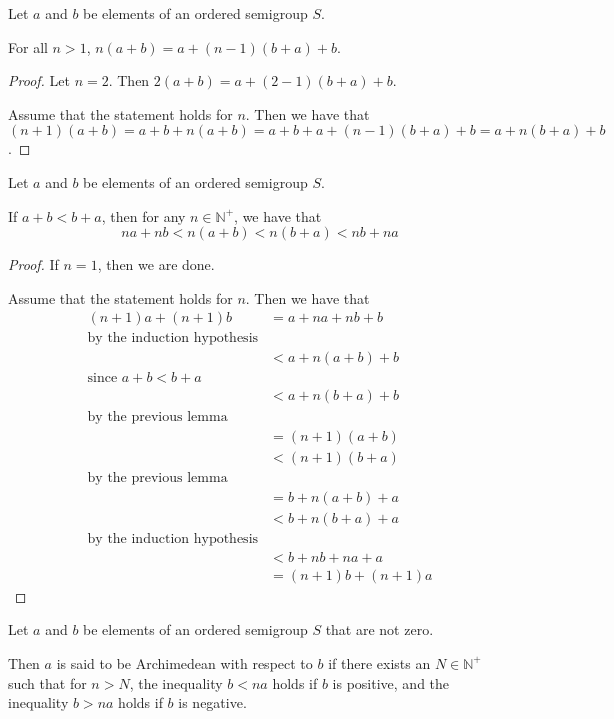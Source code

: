 \begin{lemma}\label{DecreaseN}
Let $a$ and $b$ be elements of an ordered semigroup $S$.

For all $n > 1$, $n(a+b) = a + (n-1)(b+a) + b$.
\end{lemma}
\begin{proof}
Let $n=2$. Then $2(a+b) = a + (2-1)(b+a) + b$.

Assume that the statement holds for $n$.
Then we have that $(n+1)(a+b) = a + b + n(a+b) = a + b + a + (n-1)(b+a) + b = a + n(b+a) + b$.
\end{proof}

\begin{lemma}
Let $a$ and $b$ be elements of an ordered semigroup $S$.

If $a + b < b + a$, then for any $n\in \mathbb{N}^+$, we have that
\[na + nb < n(a+b) < n(b+a) < nb + na\]
\end{lemma}
\begin{proof}
If $n=1$, then we are done.

Assume that the statement holds for $n$.
Then we have that
\begin{align}
(n+1)a + (n+1)b &= a + na + nb + b \\
\text{by the induction hypothesis}\\
&< a + n(a + b) + b \\
\text{since $a+b < b+a$}\\
&< a + n(b + a) + b \\
\text{by the previous lemma}\\
&= (n+1)(a + b) \\
&< (n+1)(b + a) \\
\text{by the previous lemma}\\
&= b + n(a + b) + a \\
&< b + n(b + a) + a \\
\text{by the induction hypothesis}\\
&< b + nb + na + a \\
&= (n+1)b + (n+1)a
\end{align}
\end{proof}

\begin{definition}
Let $a$ and $b$ be elements of an ordered semigroup $S$ that are not zero.

Then $a$ is said to be Archimedean with respect to $b$
if there exists an $N\in \mathbb{N}^+$ such that for $n > N$,
the inequality $b < na$ holds if $b$ is positive,
and the inequality $b > na$ holds if $b$ is negative.
\end{definition}

